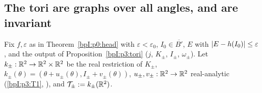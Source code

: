 \subsection{The tori are graphs over all angles, and are invariant}\label{bpI:p5:sec-graph}

Fix $f,\varepsilon$ as in Theorem~\ref{bpI:p0:head} with $\varepsilon<\varepsilon_0$, $I_0\in\overline{B'}$, $E$ with $\lvert E-h(I_0)\rvert\le\varepsilon$, and the output of Proposition~\ref{bpI:p3:tori} ($j$, $K_\pm$, $I_\pm$, $\omega_\pm$). Let $k_\pm:\mathbb{R}^2\to\mathbb{R}^2\times\mathbb{R}^2$ be the real restriction of $K_\pm$, $k_\pm(\theta)=(\theta+u_\pm(\theta),I_\pm+v_\pm(\theta))$, $u_\pm,v_\pm:\mathbb{R}^2\to\mathbb{R}^2$ real-analytic (\ref{bpI:p3:T1}, ), and $\mathcal T_\pm:=k_\pm(\mathbb{R}^2)$.


